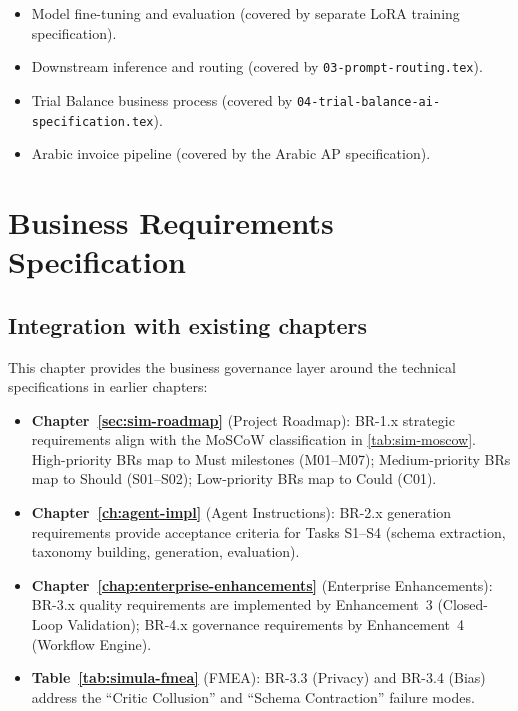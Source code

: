 \documentclass[12pt,a4paper,twoside]{report}
\begin{document}
\begin{itemize}[nosep]
\item Model fine-tuning and evaluation (covered by separate LoRA training specification).
\item Downstream inference and routing (covered by \texttt{03-prompt-routing.tex}).
\item Trial Balance business process (covered by \texttt{04-trial-balance-ai-specification.tex}).
\item Arabic invoice pipeline (covered by the Arabic AP specification).
\end{itemize}

\newpage
\chapter{Business Requirements Specification}
\label{chap:business-requirements}

\section*{Integration with existing chapters}

This chapter provides the business governance layer around the technical
specifications in earlier chapters:

\begin{itemize}
\item \textbf{Chapter~\ref{sec:sim-roadmap}} (Project Roadmap): BR-1.x strategic
requirements align with the MoSCoW classification in \cref{tab:sim-moscow}.
High-priority BRs map to Must milestones (M01--M07); Medium-priority BRs map
to Should (S01--S02); Low-priority BRs map to Could (C01).
\item \textbf{Chapter~\ref{ch:agent-impl}} (Agent Instructions): BR-2.x generation
requirements provide acceptance criteria for Tasks S1--S4 (schema extraction,
taxonomy building, generation, evaluation).
\item \textbf{Chapter~\ref{chap:enterprise-enhancements}} (Enterprise Enhancements):
BR-3.x quality requirements are implemented by Enhancement~3 (Closed-Loop
Validation); BR-4.x governance requirements by Enhancement~4 (Workflow Engine).
\item \textbf{Table~\ref{tab:simula-fmea}} (FMEA): BR-3.3 (Privacy) and BR-3.4
(Bias) address the ``Critic Collusion'' and ``Schema Contraction'' failure modes.
\end{itemize}
\end{document}
